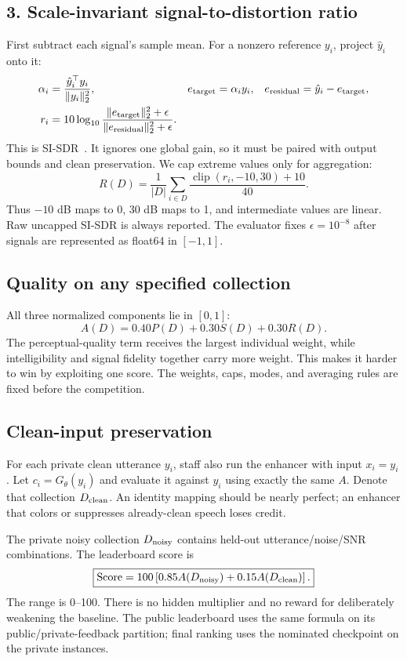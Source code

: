 \documentclass[11pt,letterpaper]{article}
\newcommand{\clip}{\operatorname{clip}}
\begin{document}
\subsection{3. Scale-invariant signal-to-distortion ratio}
First subtract each signal's sample mean. For a nonzero reference $y_i$, project $\hat y_i$ onto it:
\begin{align}
\alpha_i&=\frac{\hat y_i^\top y_i}{\|y_i\|_2^2},&
e_{\rm target}&=\alpha_i y_i,&
e_{\rm residual}&=\hat y_i-e_{\rm target},\\
r_i&=10\log_{10}\frac{\|e_{\rm target}\|_2^2+\epsilon}{\|e_{\rm residual}\|_2^2+\epsilon}.
\end{align}
This is SI-SDR~\cite{sisdr}. It ignores one global gain, so it must be paired with output bounds and clean preservation. We cap extreme values only for aggregation:
\begin{equation}
R(D)=\frac1{|D|}\sum_{i\in D}\frac{\clip(r_i,-10,30)+10}{40}.
\end{equation}
Thus $-10$ dB maps to 0, 30 dB maps to 1, and intermediate values are linear. Raw uncapped SI-SDR is always reported. The evaluator fixes $\epsilon=10^{-8}$ after signals are represented as float64 in $[-1,1]$.

\subsection{Quality on any specified collection}
All three normalized components lie in $[0,1]$:
\begin{equation}
\boxed{A(D)=0.40P(D)+0.30S(D)+0.30R(D).}
\end{equation}
The perceptual-quality term receives the largest individual weight, while intelligibility and signal fidelity together carry more weight. This makes it harder to win by exploiting one score. The weights, caps, modes, and averaging rules are fixed before the competition.

\subsection{Clean-input preservation}
For each private clean utterance $y_i$, staff also run the enhancer with input $x_i=y_i$. Let $c_i=G_\theta(y_i)$ and evaluate it against $y_i$ using exactly the same $A$. Denote that collection $D_{\rm clean}$. An identity mapping should be nearly perfect; an enhancer that colors or suppresses already-clean speech loses credit.

The private noisy collection $D_{\rm noisy}$ contains held-out utterance/noise/SNR combinations. The leaderboard score is
\begin{equation}
\boxed{\operatorname{Score}=100\left[0.85A(D_{\rm noisy})+0.15A(D_{\rm clean})\right].}
\end{equation}
The range is 0--100. There is no hidden multiplier and no reward for deliberately weakening the baseline. The public leaderboard uses the same formula on its public/private-feedback partition; final ranking uses the nominated checkpoint on the private instances.
\end{document}
